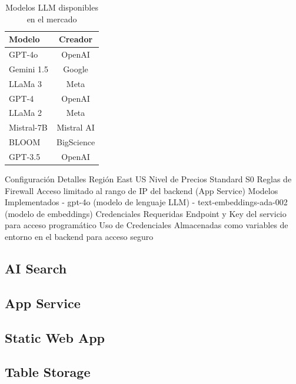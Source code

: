 \begin{table}[h]
	\centering
	\caption[Modelos LLM disponibles en el mercado]{Modelos LLM disponibles en el mercado}
	\begin{tabular}{l c}    
		\toprule
		\textbf{Modelo} 	 & \textbf{Creador} 	\\
		\midrule
		GPT-4o               & OpenAI 				\\		
		Gemini 1.5      	 & Google				\\
		LLaMa 3         	 & Meta				    \\
    GPT-4         	     & OpenAI				\\
    LLaMa 2         	 & Meta				    \\
    Mistral-7B         	 & Mistral AI		    \\
    BLOOM         	     & BigScience		    \\
    GPT-3.5         	 & OpenAI				\\
		\bottomrule
		\hline
	\end{tabular}
	\label{tab:llms}
\end{table}

Configuración	Detalles
Región	East US
Nivel de Precios	Standard S0
Reglas de Firewall	Acceso limitado al rango de IP del backend (App Service)
Modelos Implementados	- gpt-4o (modelo de lenguaje LLM)
- text-embeddings-ada-002 (modelo de embeddings)
Credenciales Requeridas	Endpoint y Key del servicio para acceso programático
Uso de Credenciales	Almacenadas como variables de entorno en el backend para acceso seguro

\subsection{AI Search}

\subsection{App Service }

\subsection{Static Web App}

\subsection{Table Storage}


